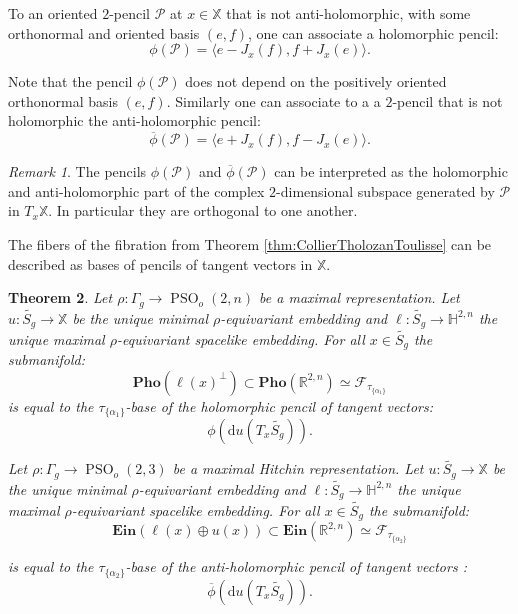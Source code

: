 \documentclass[reqno,10pt]{amsart}
\theoremstyle{plain}
\newtheorem{thm}{Theorem}[section]
\theoremstyle{definition}
\theoremstyle{remark}
\newtheorem{rem}[thm]{Remark}
\newcommand{\type}{\tau}
\newcommand{\R}{\mathbb{R}}
\DeclareMathOperator{\PSO}{PSO}
\newcommand{\Ein}{\mathbf{Ein}}
\newcommand{\Pho}{\mathbf{Pho}}
\newcommand{\X}{\mathbb{X}}
\begin{document}
To an oriented $2$-pencil $\mathcal{P}$  at $x\in \X$ that is not anti-holomorphic, with some orthonormal and oriented basis $(e,f)$, one can associate a holomorphic pencil:
 $$\phi(\mathcal{P})=\langle e-J_x(f),f+J_x(e)\rangle.$$
 
 Note that the pencil $\phi(\mathcal{P})$ does not depend on the positively oriented orthonormal basis $(e,f)$.  Similarly one can associate to a a $2$-pencil that is not holomorphic the anti-holomorphic pencil:
$$\overline{\phi}(\mathcal{P})=\langle e+J_x(f),f-J_x(e)\rangle.$$ 
 
 \begin{rem}
The pencils $\phi(\mathcal{P})$ and $\overline{\phi}(\mathcal{P})$
can be interpreted as the holomorphic and anti-holomorphic 
part of the complex $2$-dimensional subspace generated by $\mathcal{P}$ in $T_x\X$. In particular they are orthogonal to one another.
 \end{rem}
 

The fibers of the fibration from Theorem \ref{thm:CollierTholozanToulisse} can be described as bases of pencils of tangent vectors in $\X$. 

\begin{thm}
\label{thm:ComparaisonPhotons}
Let $\rho:\Gamma_g\to \PSO_o(2,n)$ be a maximal representation. Let $u:\widetilde{S_g}\to \X$ be the unique minimal $\rho$-equivariant embedding and $\ell:\widetilde{S_g}\to \mathbb{H}^{2,n}$ the unique maximal $\rho$-equivariant spacelike embedding. For all $x\in \widetilde{S_g}$ the submanifold:
$$\Pho(\ell(x)^\perp)\subset\Pho(\R^{2,n})\simeq \mathcal{F}_{\type_{\lbrace\alpha_1\rbrace}}$$
is equal to the $\type_{\lbrace\alpha_1\rbrace}$-base of the holomorphic pencil of tangent vectors:
$$\phi(\mathrm{d}u(T_x\widetilde{S_g})).$$

\medskip

Let $\rho:\Gamma_g\to \PSO_o(2,3)$ be a maximal Hitchin representation. Let $u:\widetilde{S_g}\to \X$ be the unique minimal $\rho$-equivariant embedding and $\ell:\widetilde{S_g}\to \mathbb{H}^{2,n}$ the unique maximal $\rho$-equivariant spacelike embedding. For all $x\in \widetilde{S_g}$ the submanifold:
$$\Ein(\ell(x)\oplus u(x))\subset\Ein(\R^{2,n})\simeq\mathcal{F}_{\type_{\lbrace\alpha_2\rbrace}}$$ 

is equal to the $\type_{\lbrace\alpha_2\rbrace}$-base of the anti-holomorphic pencil of tangent vectors :
$$\overline{\phi}(\mathrm{d}u(T_x\widetilde{S_g})).$$


\end{thm}
\end{document}
